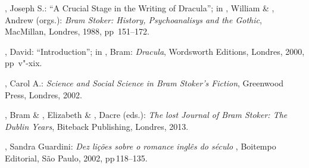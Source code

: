 \begin{bibliohedra}
, Joseph S.: ``A Crucial Stage in the Writing of Dracula''; in
  , William \& , Andrew (orgs.): \emph{Bram Stoker: History,
  Psychoanalisys and the Gothic}, MacMillan, Londres, 1988, pp\,  151--172.

, David: ``Introduction''; in , Bram: \emph{Dracula},
  Wordsworth Editions, Londres, 2000, pp\, v"-xix.


, Carol A.: \emph{Science and Social Science in Bram Stoker's
  Fiction}, Greenwood Press, Londres, 2002.

, Bram \& , Elizabeth \& , Dacre (eds.): \emph{The lost Journal of Bram Stoker: The Dublin Years}, Biteback Publishing,
  Londres, 2013.

, Sandra Guardini: \emph{Dez lições sobre o romance inglês
  do século }, Boitempo Editorial, São Paulo, 2002, pp\,118--135.
\end{bibliohedra}
